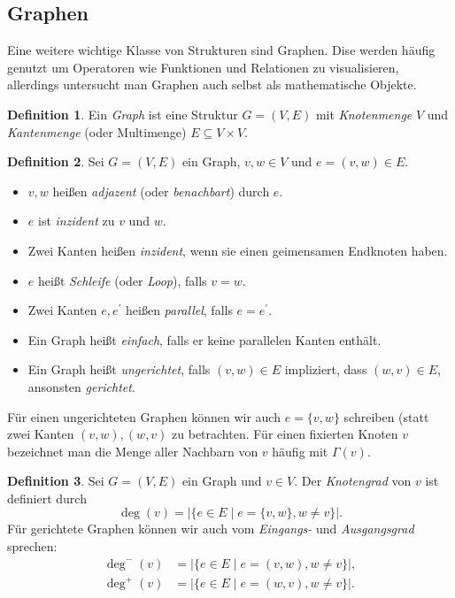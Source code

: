 \documentclass[11pt, a4paper]{article}
\theoremstyle{definition}
\newtheorem{definition}{Definition}[section]
\theoremstyle{plain}
\numberwithin{equation}{section}
\begin{document}
\subsection{Graphen}\label{sec:pre_graphs}
Eine weitere wichtige Klasse von Strukturen sind Graphen. Dise werden häufig genutzt um Operatoren wie Funktionen und Relationen zu visualisieren, allerdings untersucht man Graphen auch selbst als mathematische Objekte.
\begin{definition}
	Ein \textit{Graph} ist eine Struktur $G = (V, E)$ mit \textit{Knotenmenge} $V$ und \textit{Kantenmenge} (oder Multimenge) $E \subseteq V \times V$.
\end{definition}
\begin{definition}
	Sei $G = (V, E)$ ein Graph, $v, w \in V$ und $e = (v, w) \in E$.
	\begin{itemize}
		\item $v, w$ heißen \textit{adjazent} (oder \textit{benachbart}) durch $e$.
		\item $e$ ist \textit{inzident} zu $v$ und $w$.
		\item Zwei Kanten heißen \textit{inzident}, wenn sie einen geimensamen Endknoten haben.
		\item $e$ heißt \textit{Schleife} (oder \textit{Loop}), falls $v = w$.
		\item Zwei Kanten $e, e^\prime$ heißen \textit{parallel}, falls $e = e^\prime$.
		\item Ein Graph heißt \textit{einfach}, falls er keine parallelen Kanten enthält.
		\item Ein Graph heißt \textit{ungerichtet}, falls $(v, w) \in E$ impliziert, dass $(w, v) \in E$, ansonsten \textit{gerichtet}. 
	\end{itemize}
\end{definition}
Für einen ungerichteten Graphen können wir auch $e = \{v, w\}$ schreiben (statt zwei Kanten $(v, w), (w, v)$ zu betrachten. Für einen fixierten Knoten $v$ bezeichnet man die Menge aller Nachbarn von $v$ häufig mit $\Gamma(v)$.
\begin{definition}
	Sei $G = (V, E)$ ein Graph und $v \in V$. Der \textit{Knotengrad} von $v$ ist definiert durch
	$$
		\deg(v) = \left| \{ e \in E \mid e = \{v, w\}, w \neq v \} \right|.
	$$
	Für gerichtete Graphen können wir auch vom \textit{Eingangs-} und \textit{Ausgangsgrad} sprechen:
	\begin{align*}
		\deg^-(v) &= \left| \{ e \in E \mid e = (v, w), w \neq v \} \right|,\\
		\deg^+(v) &= \left| \{ e \in E \mid e = (w, v), w \neq v \} \right|.
	\end{align*}
\end{definition}
\end{document}

